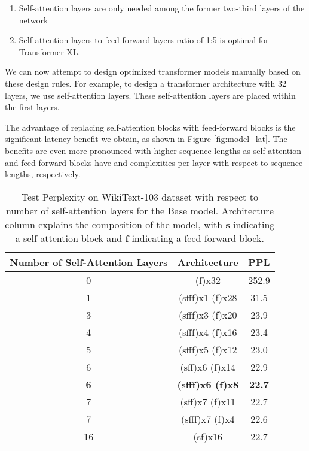 \documentclass{article}
\begin{document}
\begin{enumerate}
    \item Self-attention layers are only needed among the former two-third layers of the network
    \item Self-attention layers to feed-forward layers ratio of 1:5 is optimal for Transformer-XL.
\end{enumerate}

We can now attempt to design optimized transformer models manually based on these design rules. For example, to design a transformer architecture with 32 layers, we use  self-attention layers. These self-attention layers are placed within the first  layers.

The advantage of replacing self-attention blocks with feed-forward blocks is the significant latency benefit we obtain, as shown in Figure \ref{fig:model_lat}. The benefits are even more pronounced with higher sequence lengths as self-attention and feed forward blocks have  and  complexities per-layer with respect to sequence lengths, respectively.

\begin{table}[hbt!]
    \centering
     \begin{tabular}{||c c c||} 
     \hline
    Number of Self-Attention Layers & Architecture & PPL \\
     \hline\hline
     0 & (f)x32 & 252.9 \\ [0.5ex] 
     1 & (sfff)x1 (f)x28 & 31.5 \\ [0.5ex] 
     3 & (sfff)x3 (f)x20 & 23.9 \\ [0.5ex] 
     4 & (sfff)x4 (f)x16 & 23.4 \\ [0.5ex] 
     5 & (sfff)x5 (f)x12 & 23.0 \\ [0.5ex] 
     6 & (sff)x6 (f)x14 & 22.9 \\ [0.5ex] 
     \textbf{6} & \textbf{(sfff)x6 (f)x8} & \textbf{22.7} \\ [0.5ex] 
     7 & (sff)x7 (f)x11 & 22.7 \\ [0.5ex] 
     7 & (sfff)x7 (f)x4 & 22.6 \\ [0.5ex] 
     16 & (sf)x16 & 22.7 \\ [1ex] 
     \hline
    \end{tabular}
    \captionsetup{justification=centering}
    \caption{Test Perplexity on WikiText-103 dataset with respect to number of self-attention layers for the Base model. \hspace{\textwidth} Architecture column explains the composition of the model, with \textbf{s} indicating a self-attention block and \textbf{f} indicating a feed-forward block. }
    \label{table:wiki103_wrt_attn_layers}
\end{table}
\end{document}
